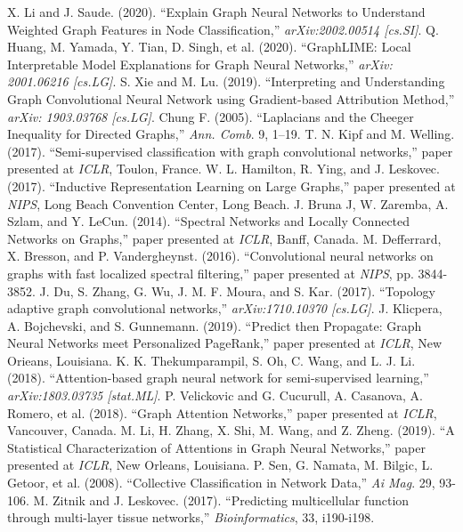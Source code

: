\documentclass[preprint,11pt]{elsarticle}
\begin{document}
\begin{thebibliography}{00}
X. Li and J. Saude. (2020). ``Explain Graph Neural Networks to Understand Weighted Graph Features in Node Classification,'' {\it arXiv:2002.00514 [cs.SI]}.
Q. Huang, M. Yamada, Y. Tian, D. Singh, et al. (2020). ``GraphLIME: Local Interpretable Model Explanations for Graph Neural Networks,'' {\it arXiv: 2001.06216 [cs.LG]}.
S. Xie and M. Lu. (2019). ``Interpreting and Understanding Graph Convolutional Neural Network using Gradient-based Attribution Method,'' {\it arXiv: 1903.03768 [cs.LG]}.
Chung F. (2005). ``Laplacians and the Cheeger Inequality for Directed Graphs,'' {\it Ann. Comb}. 9, 1–19.
T. N. Kipf and M. Welling. (2017). ``Semi-supervised classification with graph convolutional networks,'' paper presented at {\it ICLR}, Toulon, France.
W. L. Hamilton, R. Ying, and J. Leskovec. (2017). ``Inductive Representation Learning on Large Graphs,'' paper presented at {\it NIPS}, Long Beach Convention Center, Long Beach.
J. Bruna J, W. Zaremba, A. Szlam, and Y. LeCun. (2014). ``Spectral Networks and Locally Connected Networks on Graphs,'' paper presented at {\it ICLR}, Banff, Canada.
M. Defferrard, X. Bresson, and P. Vandergheynst. (2016). ``Convolutional neural networks on graphs with fast localized spectral filtering,'' paper presented at {\it NIPS}, pp. 3844-3852.
J. Du, S. Zhang, G. Wu, J. M. F. Moura, and S. Kar. (2017). ``Topology adaptive graph convolutional networks,'' {\it arXiv:1710.10370 [cs.LG]}.
J. Klicpera, A. Bojchevski, and S. Gunnemann. (2019). ``Predict then Propagate: Graph Neural Networks meet Personalized PageRank,'' paper presented at {\it ICLR}, New Orieans, Louisiana.
K. K. Thekumparampil, S. Oh, C. Wang, and L. J. Li. (2018). ``Attention-based graph neural network for semi-supervised learning,'' {\it arXiv:1803.03735 [stat.ML]}.
P. Velickovic and G. Cucurull, A. Casanova, A. Romero, et al. (2018). ``Graph Attention Networks,'' paper presented at {\it ICLR}, Vancouver, Canada.
M. Li, H. Zhang, X. Shi, M. Wang, and Z. Zheng. (2019). ``A Statistical Characterization of Attentions in Graph Neural Networks,'' paper presented at {\it ICLR}, New Orleans, Louisiana.
P. Sen, G. Namata, M. Bilgic, L. Getoor, et al. (2008). ``Collective Classification in Network Data,'' {\it Ai Mag}. 29, 93-106.
M. Zitnik and J. Leskovec. (2017). ``Predicting multicellular function through multi-layer tissue networks,'' {\it Bioinformatics}, 33, i190-i198.


\end{thebibliography}
\end{document}

